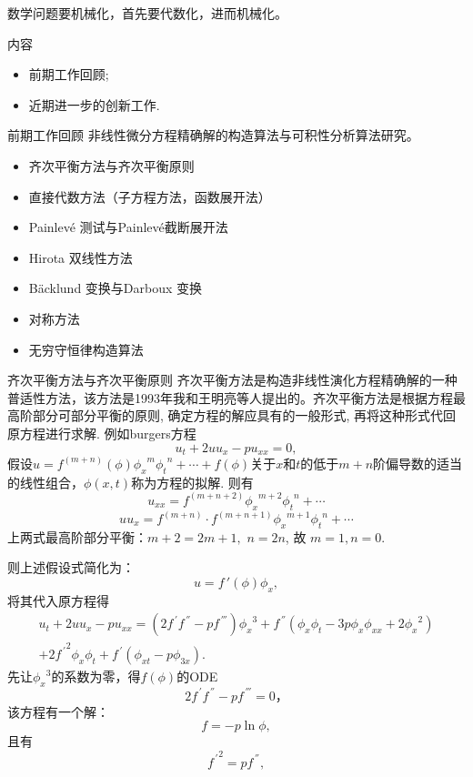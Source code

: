 \documentclass{beamer}
\begin{document}
\begin{frame}
     数学问题要机械化，首先要代数化，进而机械化。
\end{frame}
\begin{frame}{内容}
\begin{itemize}
  \item 前期工作回顾; 
  \item 近期进一步的创新工作. 
  \end{itemize}
\end{frame}
\begin{frame}{前期工作回顾}
  非线性微分方程精确解的构造算法与可积性分析算法研究。
  \begin{itemize}
    \item 齐次平衡方法与齐次平衡原则\\[1mm]
    \item 直接代数方法（子方程方法，函数展开法）\\[1mm]
    \item Painlev\'e 测试与Painlev\'e截断展开法 \\[1mm]
    \item Hirota 双线性方法 \\[1mm]
    \item B\"acklund 变换与Darboux 变换\\[1mm]
    \item 对称方法 \\[1mm]
    \item 无穷守恒律构造算法 
  \end{itemize}
\end{frame}
\begin{frame}{齐次平衡方法与齐次平衡原则}
  齐次平衡方法是构造非线性演化方程精确解的一种普适性方法，该方法是1993年我和王明亮等人提出的。齐次平衡方法是根据方程最高阶部分可部分平衡的原则, 确定方程的解应具有的一般形式, 再将这种形式代回原方程进行求解. 
  例如burgers方程
  \[
    u_t+2uu_x-pu_{xx}=0,
  \]
 假设$u=f^{(m+n)}(\phi){\phi_x}^m{\phi_t}^n+\cdots+f(\phi)$关于$x$和$t$的低于$m+n$阶偏导数的适当的线性组合，$\phi(x,t)$称为方程的拟解. 则有
 \[
   u_{xx}= f^{(m+n+2)}{\phi_x}^{m+2}{\phi_t}^n+\cdots     
\]
  \[
uu_x=f^{(m+n)}\cdot f^{(m+n+1)}{\phi_x}^{m+1}{\phi_t}^n +\cdots  
\]
上两式最高阶部分平衡：$m+2=2m+1,\,\, n=2n$, 故 $m=1,n=0$.
\end{frame}
\begin{frame}
则上述假设式简化为：
\begin{equation}\label{u_f}
  u=f\,'(\phi){\phi_x},
\end{equation}
将其代入原方程得
\begin{equation}\label{eq1}
  \begin{array}{ll}
 u_t+2uu_x-pu_{xx}=(2f^{\,'}f^{\,''}-pf^{\,'''}) {\phi_x}^3+f^{\,''}(\phi_x\phi_t-3p\phi_x\phi_{xx}+2{\phi_x}^2)\\[2mm]+2{f^{\,'}}^2\phi_x\phi_t+f^{\,'}(\phi_{xt}-p\phi_{3x}).
  \end{array}
\end{equation}
先让${\phi_x}^3$的系数为零，得$f(\phi)$的ODE
\[
  2f^{\,'}f^{\,''}-pf^{\,'''} =0，
\]
该方程有一个解：
\begin{equation}\label{sol1}
 f=-p\ln\phi, 
\end{equation}
且有 
\[
 {f^{\,'}}^2=pf^{\,''},
\]
\end{frame}
\end{document}
